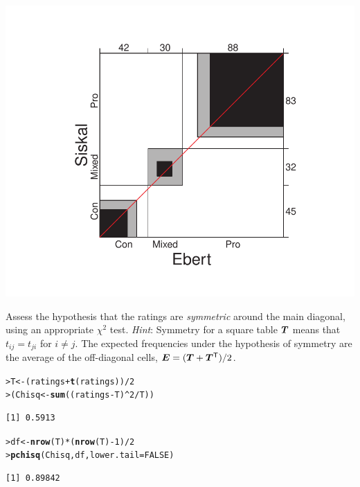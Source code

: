 \documentclass[10pt]{report}\usepackage[]{graphicx}\usepackage[]{color}
\makeatletter
\newcommand{\hlnum}[1]{\textcolor[rgb]{0.686,0.059,0.569}{#1}}%
\newcommand{\hlopt}[1]{\textcolor[rgb]{0,0,0}{#1}}%
\newcommand{\hlstd}[1]{\textcolor[rgb]{0.345,0.345,0.345}{#1}}%
\newcommand{\hlkwb}[1]{\textcolor[rgb]{0.69,0.353,0.396}{#1}}%
\newcommand{\hlkwc}[1]{\textcolor[rgb]{0.333,0.667,0.333}{#1}}%
\newcommand{\hlkwd}[1]{\textcolor[rgb]{0.737,0.353,0.396}{\textbf{#1}}}%
\newenvironment{kframe}{%
 \def\at@end@of@kframe{}%
 \ifinner\ifhmode%
  \def\at@end@of@kframe{\end{minipage}}%
  \begin{minipage}{\columnwidth}%
 \fi\fi%
 \def\FrameCommand##1{\hskip\@totalleftmargin \hskip-\fboxsep
 \colorbox{shadecolor}{##1}\hskip-\fboxsep
     \hskip-\linewidth \hskip-\@totalleftmargin \hskip\columnwidth}%
 \MakeFramed {\advance\hsize-\width
   \@totalleftmargin\z@ \linewidth\hsize
   \@setminipage}}%
 {\par\unskip\endMakeFramed%
 \at@end@of@kframe}
\newenvironment{knitrout}{}{} %
\renewenvironment{knitrout}{\small\renewcommand{\baselinestretch}{.85}}{} %
\makeatother
\begin{document}
\begin{Exercises}
\begin{enumerate*}
\begin{ans}
\begin{knitrout}
\centerline{\includegraphics[width=.5\textwidth]{soln/fig/ex4_8b-1} }



\end{knitrout}
     \end{ans}
     
     \item Assess the hypothesis that the ratings are \emph{symmetric} around the
       main diagonal, using an appropriate $\chi^2$ test.
       \emph{Hint}:  Symmetry for a square table $\bm{T}$ means that $t_{ij} = t_{ji}$
       for $i \ne j$.  The expected frequencies under the hypothesis of symmetry
       are the average of the off-diagonal cells,
       $\bm{E} = (\bm{T} + \bm{T}^\mathsf{T}) / 2$.
     \begin{ans}
\begin{knitrout}\footnotesize
{}\color{fgcolor}\begin{kframe}
\begin{alltt}
\hlstd{> }\hlstd{T} \hlkwb{<-} \hlstd{(ratings} \hlopt{+} \hlkwd{t}\hlstd{(ratings))}\hlopt{/}\hlnum{2}
\hlstd{> }\hlstd{(Chisq} \hlkwb{<-} \hlkwd{sum}\hlstd{((ratings} \hlopt{-} \hlstd{T)}\hlopt{^}\hlnum{2} \hlopt{/} \hlstd{T))}
\end{alltt}
\begin{verbatim}
[1] 0.5913
\end{verbatim}
\begin{alltt}
\hlstd{> }\hlstd{df} \hlkwb{<-} \hlkwd{nrow}\hlstd{(T)} \hlopt{*} \hlstd{(}\hlkwd{nrow}\hlstd{(T)}\hlopt{-}\hlnum{1}\hlstd{)} \hlopt{/}\hlnum{2}
\hlstd{> }\hlkwd{pchisq}\hlstd{(Chisq,df,} \hlkwc{lower.tail} \hlstd{=} \hlnum{FALSE}\hlstd{)}
\end{alltt}
\begin{verbatim}
[1] 0.89842
\end{verbatim}
\end{kframe}
\end{knitrout}


\end{ans}
\end{enumerate*}
\end{Exercises}
\end{document}
